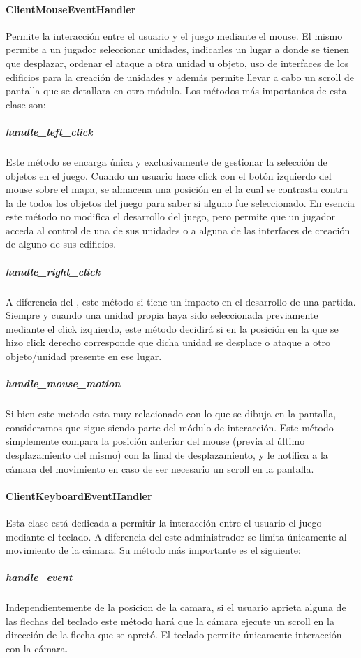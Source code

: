         \paragraph{ClientMouseEventHandler}
            Permite la interacción entre el usuario y el juego mediante el mouse.
            El mismo permite a un jugador seleccionar unidades, indicarles un
            lugar a donde se tienen que desplazar, ordenar el ataque a otra
            unidad u objeto, uso de interfaces de los edificios para la creación
            de unidades y además permite llevar a cabo un scroll de pantalla que
            se detallara en otro módulo. Los métodos más importantes de esta
            clase son:
            \subparagraph{handle\_left\_click}
                Este método se encarga única y exclusivamente de gestionar la
                selección de objetos en el juego. Cuando un usuario hace click
                con el botón izquierdo del mouse sobre el mapa, se almacena una
                posición en el  la cual se contrasta
                contra la de todos los objetos del juego para saber si alguno
                fue seleccionado. En esencia este método no modifica el
                desarrollo del juego, pero permite que un jugador acceda al
                control de una de sus unidades o a alguna de las interfaces de
                creación de alguno de sus edificios.
            \subparagraph{handle\_right\_click}
                A diferencia del , este método si tiene
                un impacto en el desarrollo de una partida. Siempre y cuando una
                unidad propia haya sido seleccionada previamente mediante el
                click izquierdo, este método decidirá si en la posición en la
                que se hizo click derecho corresponde que dicha unidad se
                desplace o ataque a otro objeto/unidad presente en ese lugar.
            \subparagraph{handle\_mouse\_motion}
                Si bien este metodo esta muy relacionado con lo que se dibuja en
                la pantalla, consideramos que sigue siendo parte del módulo de
                interacción. Este método simplemente compara la posición
                anterior del mouse (previa al último desplazamiento del mismo)
                con la final de desplazamiento, y le notifica a la cámara del
                movimiento en caso de ser necesario un scroll en la pantalla.
        \paragraph{ClientKeyboardEventHandler}
            Esta clase está dedicada a permitir la
            interacción entre el usuario el juego mediante el teclado. A
            diferencia del  este administrador se
            limita únicamente al movimiento de la cámara. Su método más
            importante es el siguiente:
            \subparagraph{handle\_event}
                Independientemente de la posicion de la camara, si el usuario
                aprieta alguna de las flechas del teclado este método hará que
                la cámara ejecute un scroll en la dirección de la flecha que se
                apretó. El teclado permite únicamente interacción con la cámara.
